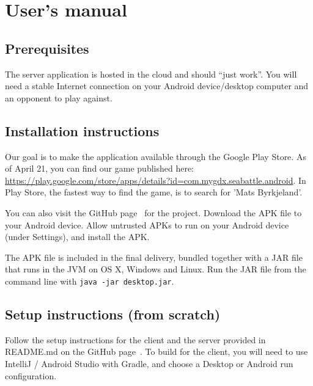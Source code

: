 \section{User's manual}

\subsection{Prerequisites}
The server application is hosted in the cloud and should ``just work''. You will need a stable Internet connection on your Android device/desktop computer and an opponent to play against. 

\subsection{Installation instructions}
Our goal is to make the application available through the Google Play Store. As of April 21, you can find our game published here: \url{https://play.google.com/store/apps/details?id=com.mygdx.seabattle.android}. In Play Store, the fastest way to find the game, is to search for 'Mats Byrkjeland'. 

You can also visit the GitHub page~\cite{github} for the project. Download the APK file to your Android device. Allow untrusted APKs to run on your Android device (under Settings), and install the APK.

The APK file is included in the final delivery, bundled together with a JAR file that runs in the JVM on OS X, Windows and Linux. Run the JAR file from the command line with \verb|java -jar desktop.jar|.

\subsection{Setup instructions (from scratch)}
Follow the setup instructions for the client and the server provided in README.md on the GitHub page~\cite{github}. To build for the client, you will need to use IntelliJ / Android Studio with Gradle, and choose a Desktop or Android run configuration. 

